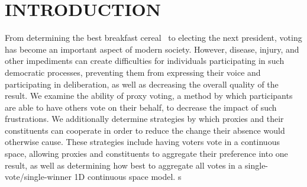 %
%

\chapter{INTRODUCTION}\label{ch:introduction}
\thispagestyle{empty}
From determining the best breakfast cereal~\cite{Curtis2021} to electing the next
president, voting has become an important aspect of modern society.
However, disease, injury, and other impediments can create difficulties for individuals
participating in such democratic processes, preventing them from expressing their
voice and participating in deliberation, as well as decreasing the overall quality of
the result.
We examine the ability of proxy voting, a method by which participants are able to
have others vote on their behalf, to decrease the impact of such frustrations.
We additionally determine strategies by which proxies and their constituents can
cooperate in order to reduce the change their absence would otherwise cause.
These strategies include having voters vote in a continuous space, allowing proxies
and constituents to aggregate their preference into one result, as well as
determining how best to aggregate all votes in a single-vote/single-winner 1D
continuous space model.
s









